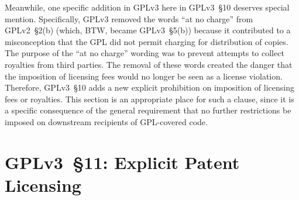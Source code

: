 Meanwhile, one specific addition in GPLv3 here in GPLv3~\S10 deserves special
mention.  Specifically, GPLv3 removed the words ``at no charge'' from
GPLv2~\S2(b) (which, BTW, became GPLv3~\S5(b)) because it contributed to a misconception that the GPL did not
permit charging for distribution of copies.  The purpose of the ``at no
charge'' wording was to prevent attempts to collect royalties from third
parties.  The removal of these words created the danger that the imposition
of licensing fees would no longer be seen as a license violation.  Therefore,
GPLv3~\S10 adds a new explicit prohibition on imposition of licensing fees or
royalties.  This section is an appropriate place for such a clause, since it
is a specific consequence of the general requirement that no further
restrictions be imposed on downstream recipients of GPL-covered code.



\section{GPLv3~\S11: Explicit Patent Licensing}
\label{GPLv3s11}

